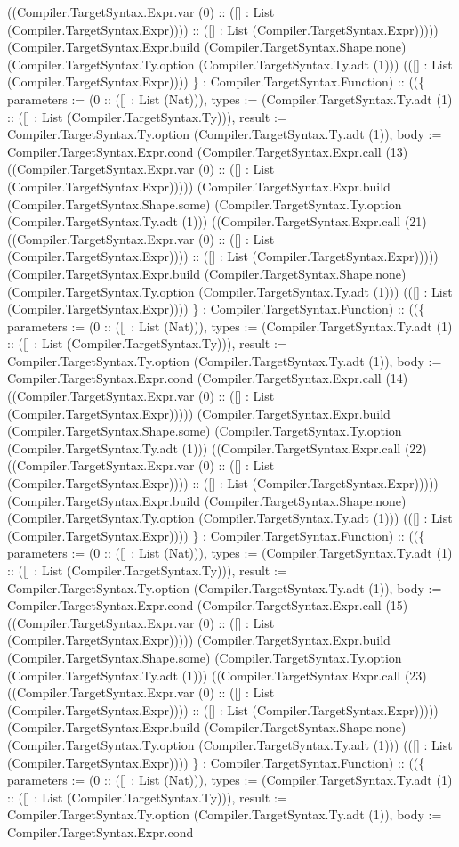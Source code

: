 \documentclass[11pt]{article}
\begin{document}
((Compiler.TargetSyntax.Expr.var (0) :: ([] : List (Compiler.TargetSyntax.Expr)))) :: ([] : List (Compiler.TargetSyntax.Expr))))) (Compiler.TargetSyntax.Expr.build (Compiler.TargetSyntax.Shape.none) (Compiler.TargetSyntax.Ty.option (Compiler.TargetSyntax.Ty.adt (1))) (([] : List (Compiler.TargetSyntax.Expr)))) \} : Compiler.TargetSyntax.Function) :: ((\{ parameters := (0 :: ([] : List (Nat))), types := (Compiler.TargetSyntax.Ty.adt (1) :: ([] : List (Compiler.TargetSyntax.Ty))), result := Compiler.TargetSyntax.Ty.option (Compiler.TargetSyntax.Ty.adt (1)), body := Compiler.TargetSyntax.Expr.cond (Compiler.TargetSyntax.Expr.call (13) ((Compiler.TargetSyntax.Expr.var (0) :: ([] : List (Compiler.TargetSyntax.Expr))))) (Compiler.TargetSyntax.Expr.build (Compiler.TargetSyntax.Shape.some) (Compiler.TargetSyntax.Ty.option (Compiler.TargetSyntax.Ty.adt (1))) ((Compiler.TargetSyntax.Expr.call (21) ((Compiler.TargetSyntax.Expr.var (0) :: ([] : List (Compiler.TargetSyntax.Expr)))) :: ([] : List (Compiler.TargetSyntax.Expr))))) (Compiler.TargetSyntax.Expr.build (Compiler.TargetSyntax.Shape.none) (Compiler.TargetSyntax.Ty.option (Compiler.TargetSyntax.Ty.adt (1))) (([] : List (Compiler.TargetSyntax.Expr)))) \} : Compiler.TargetSyntax.Function) :: ((\{ parameters := (0 :: ([] : List (Nat))), types := (Compiler.TargetSyntax.Ty.adt (1) :: ([] : List (Compiler.TargetSyntax.Ty))), result := Compiler.TargetSyntax.Ty.option (Compiler.TargetSyntax.Ty.adt (1)), body := Compiler.TargetSyntax.Expr.cond (Compiler.TargetSyntax.Expr.call (14) ((Compiler.TargetSyntax.Expr.var (0) :: ([] : List (Compiler.TargetSyntax.Expr))))) (Compiler.TargetSyntax.Expr.build (Compiler.TargetSyntax.Shape.some) (Compiler.TargetSyntax.Ty.option (Compiler.TargetSyntax.Ty.adt (1))) ((Compiler.TargetSyntax.Expr.call (22) ((Compiler.TargetSyntax.Expr.var (0) :: ([] : List (Compiler.TargetSyntax.Expr)))) :: ([] : List (Compiler.TargetSyntax.Expr))))) (Compiler.TargetSyntax.Expr.build (Compiler.TargetSyntax.Shape.none) (Compiler.TargetSyntax.Ty.option (Compiler.TargetSyntax.Ty.adt (1))) (([] : List (Compiler.TargetSyntax.Expr)))) \} : Compiler.TargetSyntax.Function) :: ((\{ parameters := (0 :: ([] : List (Nat))), types := (Compiler.TargetSyntax.Ty.adt (1) :: ([] : List (Compiler.TargetSyntax.Ty))), result := Compiler.TargetSyntax.Ty.option (Compiler.TargetSyntax.Ty.adt (1)), body := Compiler.TargetSyntax.Expr.cond (Compiler.TargetSyntax.Expr.call (15) ((Compiler.TargetSyntax.Expr.var (0) :: ([] : List (Compiler.TargetSyntax.Expr))))) (Compiler.TargetSyntax.Expr.build (Compiler.TargetSyntax.Shape.some) (Compiler.TargetSyntax.Ty.option (Compiler.TargetSyntax.Ty.adt (1))) ((Compiler.TargetSyntax.Expr.call (23) ((Compiler.TargetSyntax.Expr.var (0) :: ([] : List (Compiler.TargetSyntax.Expr)))) :: ([] : List (Compiler.TargetSyntax.Expr))))) (Compiler.TargetSyntax.Expr.build (Compiler.TargetSyntax.Shape.none) (Compiler.TargetSyntax.Ty.option (Compiler.TargetSyntax.Ty.adt (1))) (([] : List (Compiler.TargetSyntax.Expr)))) \} : Compiler.TargetSyntax.Function) :: ((\{ parameters := (0 :: ([] : List (Nat))), types := (Compiler.TargetSyntax.Ty.adt (1) :: ([] : List (Compiler.TargetSyntax.Ty))), result := Compiler.TargetSyntax.Ty.option (Compiler.TargetSyntax.Ty.adt (1)), body := Compiler.TargetSyntax.Expr.cond 
\end{document}
